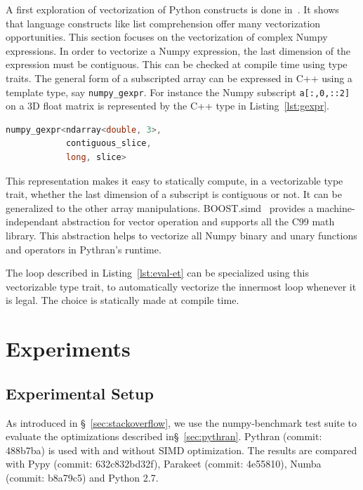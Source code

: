 \documentclass[10pt, preprint]{sigplanconf}
\begin{document}
A first exploration of vectorization of Python constructs is done
in~\cite{wpmvp2014}. It shows that language constructs like list comprehension
offer many vectorization opportunities. This section focuses on the
vectorization of complex Numpy expressions. In order to vectorize a Numpy
expression, the last dimension of the expression must be contiguous. This can
be checked at compile time using type traits. The general form of a subscripted
array can be expressed in C++ using a template type, say \texttt{numpy\_gexpr}.
For instance the Numpy subscript \lstinline|a[:,0,::2]| on a 3D float matrix is
represented by the C++ type in Listing~\ref{lst:gexpr}.

\begin{lstlisting}[language=c++, caption={C++ type corresponding to the Numpy subscript \lstinline{a[:,0,::2]} on a 3D float matrix}, label={lst:gexpr}]
numpy_gexpr<ndarray<double, 3>,
            contiguous_slice,
            long, slice>
\end{lstlisting}

This representation makes it easy to
statically compute, in a vectorizable type trait, whether the last dimension of
a subscript is contiguous or not. It can be generalized to the other array
manipulations. BOOST.simd~\cite{esterie2012boost} provides a
machine-independant abstraction for vector operation and supports all the C99
math library. This abstraction helps to vectorize all Numpy binary and unary
functions and operators in Pythran's runtime.

The loop described in Listing~\ref{lst:eval-et} can be specialized using this
vectorizable type trait, to automatically vectorize the innermost loop whenever
it is legal. The choice is statically made at compile time.


\section{Experiments} \label{sec:xp}


\subsection{Experimental Setup}

As introduced in \S~\ref{sec:stackoverflow}, we use the numpy-benchmark test
suite to evaluate the optimizations described in\S~\ref{sec:pythran}.
Pythran (commit: 488b7ba) is used  with and without SIMD optimization.
The results are compared with Pypy (commit: 632c832bd32f), Parakeet (commit: 4e55810),
Numba (commit: b8a79c5) and Python 2.7.
\end{document}
